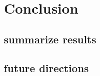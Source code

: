 \documentclass[../main/TimeForcingSHE.tex]{subfiles}
\begin{document}
\section{Conclusion}
\subsection{summarize results}
\subsection{future directions}
\end{document}
